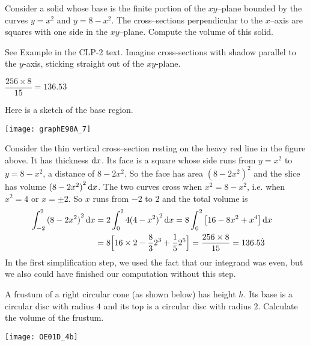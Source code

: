 \begin{question}[1998A] %
Consider a solid whose base is the finite portion of the
$xy$--plane bounded by the curves $y=x^2$ and $y=8-x^2$. The cross--sections
perpendicular to the $x$--axis are squares with one side in the $xy$--plane.
Compute the volume of this solid.
\end{question}

\begin{hint}
See Example  in the
CLP-2 text. Imagine cross-sections with shadow parallel to the $y$-axis, sticking straight out of the $xy$-plane.
\end{hint}

\begin{answer}
 $\dfrac{256\times 8}{15}=136.5\dot3$
\end{answer}

\begin{solution}
Here is a sketch of the base region.

\begin{center}
       \texttt{[image: graphE98A\_7]}
\end{center}

\noindent
Consider the thin vertical cross--section resting on the heavy red
line in the figure above. It has thickness $\mathrm{d}x$. Its face is a square
whose side runs from $y=x^2$ to $y=8-x^2$, a distance of $8-2x^2$. So the
face has area ${(8-2x^2)}^2$ and the slice has volume ${(8-2x^2)}^2\,\mathrm{d}x$. The two
curves cross when $x^2=8-x^2$, i.e. when $x^2=4$ or $x=\pm 2$. So $x$ runs
from $-2$ to $2$ and the total volume is
\begin{align*}
\int_{-2}^{2}{(8-2x^2)}^2\,\mathrm{d}x&=2\int_0^2 4{(4-x^2)}^2\,\mathrm{d}x
=8\int_0^2\big[16-8x^2+x^4\big]\,\mathrm{d}x\cr
&=8\Big[16\times 2-\frac{8}{3}2^3+\frac{1}{5}2^5\Big]
=\frac{256\times 8}{15}=136.5\dot3
\end{align*}
In the first simplification step, we used the fact that our integrand was even, but we also could have finished our computation without this step.
\end{solution}

\begin{Mquestion}[2001D] %
A frustum of a right circular cone (as shown below) has
height $h$. Its base is a circular disc with radius $4$ and its top is
a circular disc with radius $2$. Calculate the volume of the frustum.
\begin{center}
       \texttt{[image: OE01D\_4b]}
\end{center}
\end{Mquestion}

